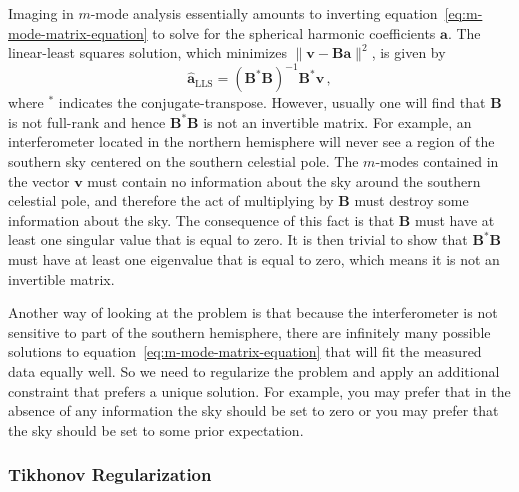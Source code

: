 \documentclass[twocolumn]{aastex6}
\renewcommand{\b}{\pmb}
\begin{document}
Imaging in $m$-mode analysis essentially amounts to inverting
equation~\ref{eq:m-mode-matrix-equation} to solve for the spherical harmonic coefficients $\b a$.
The linear-least squares solution, which minimizes $\|\b v - \b B\b a\|^2$, is given by
\begin{equation}
    \b{\hat a}_\text{LLS} = (\b B^*\b B)^{-1}\b B^*\b v\,,
\end{equation}
where $^*$ indicates the conjugate-transpose. However, usually one will find that $\b B$ is not
full-rank and hence $\b B^*\b B$ is not an invertible matrix. For example, an interferometer located
in the northern hemisphere will never see a region of the southern sky centered on the southern
celestial pole. The $m$-modes contained in the vector $\b v$ must contain no information
about the sky around the southern celestial pole, and therefore the act of multiplying by $\b B$
must destroy some information about the sky. The consequence of this fact is that $\b B$ must have
at least one singular value that is equal to zero. It is then trivial to show that $\b B^*\b B$ must
have at least one eigenvalue that is equal to zero, which means it is not an invertible matrix.

Another way of looking at the problem is that because the interferometer is not sensitive to part of
the southern hemisphere, there are infinitely many possible solutions to
equation~\ref{eq:m-mode-matrix-equation} that will fit the measured data equally well. So we need to
regularize the problem and apply an additional constraint that prefers a unique solution. For
example, you may prefer that in the absence of any information the sky should be set to zero or you
may prefer that the sky should be set to some prior expectation.

\subsubsection{Tikhonov Regularization}
\end{document}
